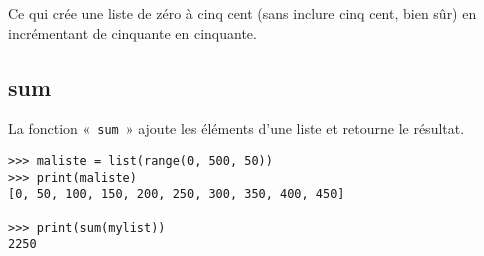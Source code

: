 Ce qui crée une liste de zéro à cinq cent (sans inclure cinq cent, bien sûr) en incrémentant de cinquante en cinquante.

\subsection*{sum}

La fonction «~\texttt{sum}~» ajoute les éléments d'une liste et retourne le résultat.
\begin{Verbatim}[frame=single,rulecolor=\color{gray}]
>>> maliste = list(range(0, 500, 50))
>>> print(maliste)
[0, 50, 100, 150, 200, 250, 300, 350, 400, 450]

>>> print(sum(mylist))
2250
\end{Verbatim}

\newpage
